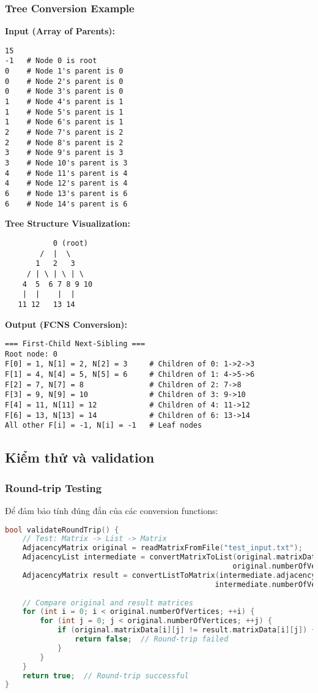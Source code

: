 \documentclass[12pt]{article}
\begin{document}
\subsubsection*{Tree Conversion Example}
\textbf{Input (Array of Parents):}
\begin{verbatim}
15
-1   # Node 0 is root
0    # Node 1's parent is 0
0    # Node 2's parent is 0
0    # Node 3's parent is 0
1    # Node 4's parent is 1
1    # Node 5's parent is 1
1    # Node 6's parent is 1
2    # Node 7's parent is 2
2    # Node 8's parent is 2
3    # Node 9's parent is 3
3    # Node 10's parent is 3
4    # Node 11's parent is 4
4    # Node 12's parent is 4
6    # Node 13's parent is 6
6    # Node 14's parent is 6
\end{verbatim}

\textbf{Tree Structure Visualization:}
\begin{verbatim}
           0 (root)
        /  |  \
       1   2   3
     / | \ | \ | \
    4  5  6 7 8 9 10
    |  |    |  |
   11 12   13 14
\end{verbatim}

\textbf{Output (FCNS Conversion):}
\begin{verbatim}
=== First-Child Next-Sibling ===
Root node: 0
F[0] = 1, N[1] = 2, N[2] = 3     # Children of 0: 1->2->3
F[1] = 4, N[4] = 5, N[5] = 6     # Children of 1: 4->5->6
F[2] = 7, N[7] = 8               # Children of 2: 7->8
F[3] = 9, N[9] = 10              # Children of 3: 9->10
F[4] = 11, N[11] = 12            # Children of 4: 11->12
F[6] = 13, N[13] = 14            # Children of 6: 13->14
All other F[i] = -1, N[i] = -1   # Leaf nodes
\end{verbatim}

\subsection*{Kiểm thử và validation}

\subsubsection*{Round-trip Testing}
Để đảm bảo tính đúng đắn của các conversion functions:

\begin{lstlisting}[language=C++, basicstyle=\ttfamily\footnotesize, frame=single]
bool validateRoundTrip() {
    // Test: Matrix -> List -> Matrix
    AdjacencyMatrix original = readMatrixFromFile("test_input.txt");
    AdjacencyList intermediate = convertMatrixToList(original.matrixData, 
                                                    original.numberOfVertices);
    AdjacencyMatrix result = convertListToMatrix(intermediate.adjacencyData, 
                                                intermediate.numberOfVertices);
    
    // Compare original and result matrices
    for (int i = 0; i < original.numberOfVertices; ++i) {
        for (int j = 0; j < original.numberOfVertices; ++j) {
            if (original.matrixData[i][j] != result.matrixData[i][j]) {
                return false;  // Round-trip failed
            }
        }
    }
    return true;  // Round-trip successful
}
\end{lstlisting}
\end{document}
